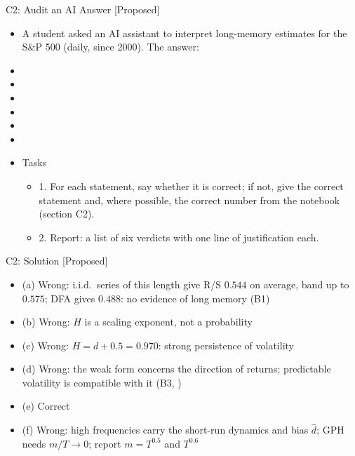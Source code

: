 \begin{frame}{C2: Audit an AI Answer [Proposed]}
\itemsize{\scriptsize}
\begin{itemize}
    \item A student asked an AI assistant to interpret long-memory estimates for the S\&P 500 (daily, since 2000). The answer:
    \item {}
    \item {}
    \item {}
    \item {}
    \item {}
    \item {}
    \item Tasks
    \begin{itemize}
        \item 1. For each statement, say whether it is correct; if not, give the correct statement and, where possible, the correct number from the notebook (section C2).
        \item 2. Report: a list of six verdicts with one line of justification each.
    \end{itemize}
\end{itemize}
\end{frame}

\ifsolutions
\begin{frame}{C2: Solution [Proposed]}
\itemsize{\footnotesize}
\begin{itemize}
    \item (a) Wrong: i.i.d.\ series of this length give R/S $0.544$ on average, band up to $0.575$; DFA gives $0.488$: no evidence of long memory (B1)
    \item (b) Wrong: $H$ is a scaling exponent, not a probability
    \item (c) Wrong: $H = d + 0.5 = 0.970$: strong persistence of volatility
    \item (d) Wrong: the weak form concerns the direction of returns; predictable volatility is compatible with it (B3, )
    \item (e) Correct
    \item (f) Wrong: high frequencies carry the short-run dynamics and bias $\hat d$; GPH needs $m/T \to 0$; report $m = T^{0.5}$ and $T^{0.6}$
\end{itemize}
\end{frame}
\fi


